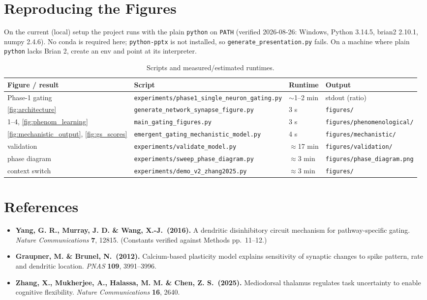 \documentclass[11pt,a4paper]{article}
\begin{document}
\section{Reproducing the Figures}
On the current (local) setup the project runs with the plain \texttt{python} on
\texttt{PATH} (verified 2026-08-26: Windows, Python 3.14.5, brian2 2.10.1, numpy 2.4.6).
No conda is required here; \texttt{python-pptx} is not installed, so
\texttt{generate\_presentation.py} fails. On a machine where plain \texttt{python} lacks
Brian 2, create an env and point at its interpreter.

\begin{table}[H]
    \centering
    \small
    \begin{tabular}{@{}llll@{}}
    \toprule
    \textbf{Figure / result} & \textbf{Script} & \textbf{Runtime} & \textbf{Output} \\ \midrule
    Phase-1 gating
      & \texttt{experiments/phase1\_single\_neuron\_gating.py} & $\sim$1--2 min & stdout (ratio) \\
    \ref{fig:architecture}
      & \texttt{generate\_network\_synapse\_figure.py} & 3 s & \texttt{figures/} \\
    1--4, \ref{fig:phenom_learning}
      & \texttt{main\_gating\_figures.py} & 3 s & \texttt{figures/phenomenological/} \\
    \ref{fig:mechanistic_output}, \ref{fig:gs_scores}
      & \texttt{emergent\_gating\_mechanistic\_model.py} & 4 s & \texttt{figures/mechanistic/} \\
    validation
      & \texttt{experiments/validate\_model.py} & $\approx$17 min & \texttt{figures/validation/} \\
    phase diagram
      & \texttt{experiments/sweep\_phase\_diagram.py} & $\approx$3 min & \texttt{figures/phase\_diagram.png} \\
    context switch
      & \texttt{experiments/demo\_v2\_zhang2025.py} & $\approx$3 min & \texttt{figures/} \\ \bottomrule
    \end{tabular}
    \caption{Scripts and measured/estimated runtimes.}
\end{table}

\section*{References}
\begin{itemize}
    \item \textbf{Yang, G. R., Murray, J. D. \& Wang, X.-J.\ (2016).} A dendritic
      disinhibitory circuit mechanism for pathway-specific gating. \textit{Nature
      Communications} \textbf{7}, 12815. (Constants verified against Methods pp.~11--12.)
    \item \textbf{Graupner, M. \& Brunel, N.\ (2012).} Calcium-based plasticity model
      explains sensitivity of synaptic changes to spike pattern, rate and dendritic
      location. \textit{PNAS} \textbf{109}, 3991--3996.
    \item \textbf{Zhang, X., Mukherjee, A., Halassa, M. M. \& Chen, Z. S.\ (2025).}
      Mediodorsal thalamus regulates task uncertainty to enable cognitive flexibility.
      \textit{Nature Communications} \textbf{16}, 2640.
\end{itemize}
\end{document}
